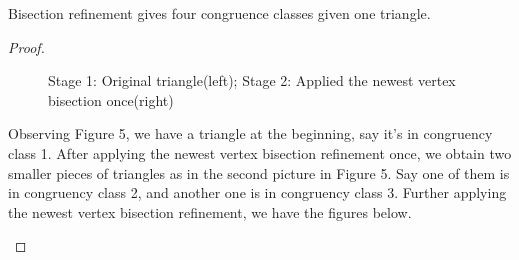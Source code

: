     \begin{lemma*}
    Bisection refinement gives four congruence classes given one triangle.
    \end{lemma*}
    \begin{proof}
    \begin{figure}[h!]
    \centering
    \caption{Stage 1: Original triangle(left); Stage 2: Applied the newest vertex bisection once(right)}
    \label{fig5: sub1}
    \end{figure}

    Observing Figure 5, we have a triangle at the beginning, say it's in congruency class 1. After applying the newest vertex bisection refinement once, we obtain two smaller pieces of triangles as in the second picture in Figure 5. Say one of them is in congruency class 2, and another one is in congruency class 3. Further applying the newest vertex bisection refinement, we have the figures below.

    \begin{figure}[h!]
    \centering
\end{figure}
\end{proof}

